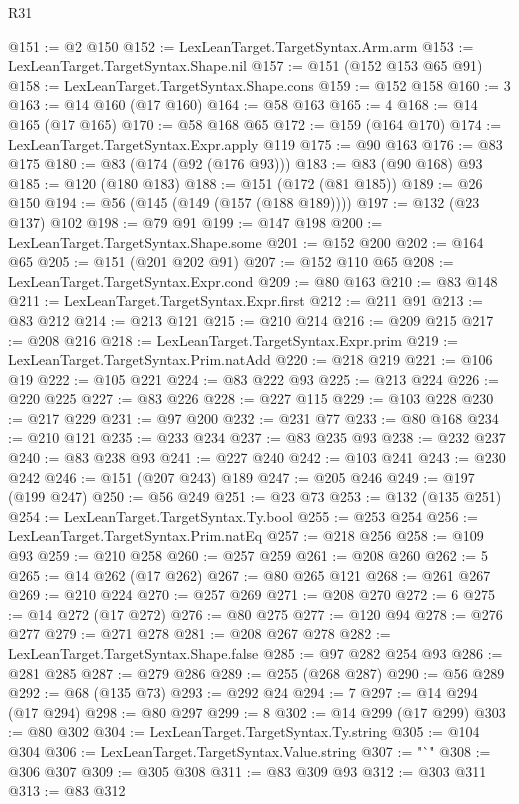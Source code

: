 \begin{lexlean}{R31}
\begin{coremodule}
@151 := @2 @150
@152 := LexLeanTarget.TargetSyntax.Arm.arm
@153 := LexLeanTarget.TargetSyntax.Shape.nil
@157 := @151 (@152 @153 @65 @91)
@158 := LexLeanTarget.TargetSyntax.Shape.cons
@159 := @152 @158
@160 := 3
@163 := @14 @160 (@17 @160)
@164 := @58 @163
@165 := 4
@168 := @14 @165 (@17 @165)
@170 := @58 @168 @65
@172 := @159 (@164 @170)
@174 := LexLeanTarget.TargetSyntax.Expr.apply @119
@175 := @90 @163
@176 := @83 @175
@180 := @83 (@174 (@92 (@176 @93)))
@183 := @83 (@90 @168) @93
@185 := @120 (@180 @183)
@188 := @151 (@172 (@81 @185))
@189 := @26 @150
@194 := @56 (@145 (@149 (@157 (@188 @189))))
@197 := @132 (@23 @137) @102
@198 := @79 @91
@199 := @147 @198
@200 := LexLeanTarget.TargetSyntax.Shape.some
@201 := @152 @200
@202 := @164 @65
@205 := @151 (@201 @202 @91)
@207 := @152 @110 @65
@208 := LexLeanTarget.TargetSyntax.Expr.cond
@209 := @80 @163
@210 := @83 @148
@211 := LexLeanTarget.TargetSyntax.Expr.first
@212 := @211 @91
@213 := @83 @212
@214 := @213 @121
@215 := @210 @214
@216 := @209 @215
@217 := @208 @216
@218 := LexLeanTarget.TargetSyntax.Expr.prim
@219 := LexLeanTarget.TargetSyntax.Prim.natAdd
@220 := @218 @219
@221 := @106 @19
@222 := @105 @221
@224 := @83 @222 @93
@225 := @213 @224
@226 := @220 @225
@227 := @83 @226
@228 := @227 @115
@229 := @103 @228
@230 := @217 @229
@231 := @97 @200
@232 := @231 @77
@233 := @80 @168
@234 := @210 @121
@235 := @233 @234
@237 := @83 @235 @93
@238 := @232 @237
@240 := @83 @238 @93
@241 := @227 @240
@242 := @103 @241
@243 := @230 @242
@246 := @151 (@207 @243) @189
@247 := @205 @246
@249 := @197 (@199 @247)
@250 := @56 @249
@251 := @23 @73
@253 := @132 (@135 @251)
@254 := LexLeanTarget.TargetSyntax.Ty.bool
@255 := @253 @254
@256 := LexLeanTarget.TargetSyntax.Prim.natEq
@257 := @218 @256
@258 := @109 @93
@259 := @210 @258
@260 := @257 @259
@261 := @208 @260
@262 := 5
@265 := @14 @262 (@17 @262)
@267 := @80 @265 @121
@268 := @261 @267
@269 := @210 @224
@270 := @257 @269
@271 := @208 @270
@272 := 6
@275 := @14 @272 (@17 @272)
@276 := @80 @275
@277 := @120 @94
@278 := @276 @277
@279 := @271 @278
@281 := @208 @267 @278
@282 := LexLeanTarget.TargetSyntax.Shape.false
@285 := @97 @282 @254 @93
@286 := @281 @285
@287 := @279 @286
@289 := @255 (@268 @287)
@290 := @56 @289
@292 := @68 (@135 @73)
@293 := @292 @24
@294 := 7
@297 := @14 @294 (@17 @294)
@298 := @80 @297
@299 := 8
@302 := @14 @299 (@17 @299)
@303 := @80 @302
@304 := LexLeanTarget.TargetSyntax.Ty.string
@305 := @104 @304
@306 := LexLeanTarget.TargetSyntax.Value.string
@307 := "`"
@308 := @306 @307
@309 := @305 @308
@311 := @83 @309 @93
@312 := @303 @311
@313 := @83 @312

\end{coremodule}
\end{lexlean}

